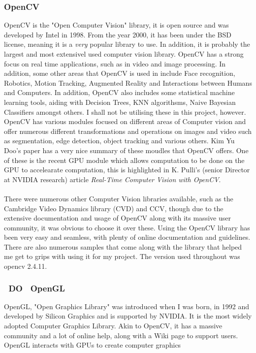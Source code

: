 \documentclass[11pt]{article}
\begin{document}
\subsubsection{OpenCV}
OpenCV is the "Open Computer Vision" library, it is open source and was
developed by Intel in 1998. From the year 2000, it has been under the BSD
license, meaning it is a \textit{very} popular library to use. In addition,
it is probably the largest and most extensivel used computer vision library.
OpenCV has a strong focus on real time applications, such as in video and
image processing. In addition, some other areas that
OpenCV is used in include Face recognition, Robotics, Motion Tracking, 
Augmented Reality and Interactions between Humans and Computers. In addition,
OpenCV also includes some statistical machine learning tools, aiding with
Decision Trees, KNN algorithsms, Naive Bayesian Classifiers amongst others. 
I shall not be utilising these in this project, however.
OpenCV has various modules focused on different areas of
Computer vision and offer numerous different transformations and operations
on images and video such as segmentation, edge detection, object tracking and
various others. Kim Yu Doo's paper\cite{Kim14} has a very nice summary of
these moudles that OpenCV offers. One of these is the recent GPU module which
allows computation to be done on the GPU to accelearate computation, this is
highlighted in K. Pulli's (senior Director at NVIDIA research) article  
\textit{Real-Time Computer Vision with OpenCV}\cite{Pulli12}.\\
\\
There were numerous other Computer Vision libraries available, such as 
the Cambridge Video Dynamics library (CVD) and CCV, though due to the extensive
documentation and usage of OpenCV along with its massive user
community, it was obvious to choose it over these. 
Using the OpenCV library has been very easy and seamless, with plenty
of online documentation and guidelines. There are also numerous samples
that come along with the library that helped me get to grips with using it 
for my project. The version used throughout was opencv 2.4.11.

\subsubsection{~DO~ OpenGL}
OpenGL, "Open Graphics Library" was introduced when I was born, in 1992 and
developed by Silicon Graphics and is supported by NVIDIA. 
It is the most widely adopted Computer Graphics Library. Akin to OpenCV, it
has a massive community and a lot of online help, along with a Wiki page to
support users. OpenGL interacts with GPUs to create computer graphics 
\end{document}
